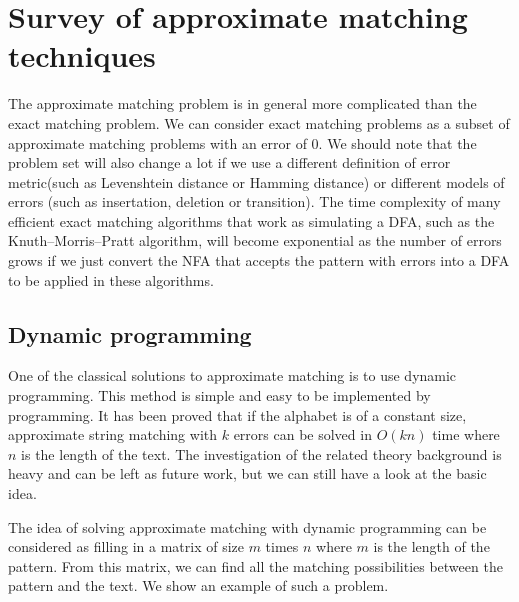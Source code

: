 \section{Survey of approximate matching techniques}
The approximate matching problem is in general more complicated than the exact matching problem. We can consider exact matching problems as a subset of approximate matching problems with an error of 0. We should note that the problem set will also change a lot if we use a different definition of error metric(such as Levenshtein distance or Hamming distance) or different models of errors (such as insertation, deletion or transition). The time complexity of many efficient exact matching algorithms that work as simulating a DFA, such as the Knuth–Morris–Pratt algorithm, will become exponential as the number of errors grows if we just convert the NFA that accepts the pattern with errors into a DFA to be applied in these algorithms. 


\subsection{Dynamic programming}

One of the classical solutions to approximate matching is to use dynamic programming. This method is simple and easy to be implemented by programming. It has been proved that if the alphabet is of a constant size, approximate string matching with $k$ errors can be solved in $O(kn)$ time where $n$ is the length of the text\cite{crochemore-jewels}. The investigation of the related theory background is heavy and can be left as future work, but we can still have a look at the basic idea.

The idea of solving approximate matching with dynamic programming can be considered as filling in a matrix of size $m$ times $n$ where $m$ is the length of the pattern. From this matrix, we can find all the matching possibilities between the pattern and the text. We show an example of such a problem.


